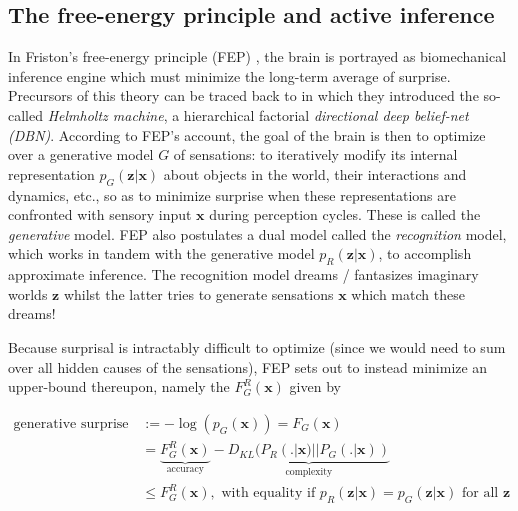 \documentclass[10pt,letterpaper]{article}
\def\z{\mathbf{z}}
\def\x{\mathbf{x}}
\begin{document}
\subsection{The free-energy principle and active inference}
In Friston's free-energy principle (FEP) \citep{friston2010free,fristonAIorRL}, the brain is portrayed
as biomechanical inference engine which must minimize the long-term average of surprise.
Precursors of this theory can be traced back to \citep{dayan1995helmholtz} in which they introduced the so-called \textit{Helmholtz machine}, a hierarchical factorial \textit{directional deep belief-net (DBN)}. According to FEP's account, the goal of the brain is then to optimize over a generative model $G$ of sensations: to iteratively
modify its internal representation $p_G(\z|\x)$ about objects in the world, their interactions and dynamics, etc., so as to minimize surprise when these representations are confronted with sensory input $\x$ during perception cycles. These is called the \textit{generative} model. FEP also postulates a dual model called the \textit{recognition} model,
which works in tandem with the generative model $p_R(\z|\x)$, to accomplish approximate inference. The recognition model dreams / fantasizes imaginary worlds $\z$ whilst the latter tries to generate sensations $\x$ which match these dreams!

Because surprisal is intractably difficult to optimize (since we would need to sum over all hidden causes of the sensations), FEP sets out to instead minimize an upper-bound thereupon, namely the  $F_G^R(\x)$ given by

  \begin{equation}
    \begin{split}
      \text{generative surprise } &:= -\log(p_G(\x)) = F_G(\x) \\
      &=\underbrace{F^R_G(\x)}_{\text{accuracy}} - \underbrace{D_{KL}(P_R(.|\x) || P_G(.|\x))}_{\text{complexity}} \\
      &\le F^R_G(\x),
      \text{ with equality if }p_R(\z|\x) = p_G(\z|\x)\text{ for all } \z
    \end{split}
  \end{equation}
\end{document}

